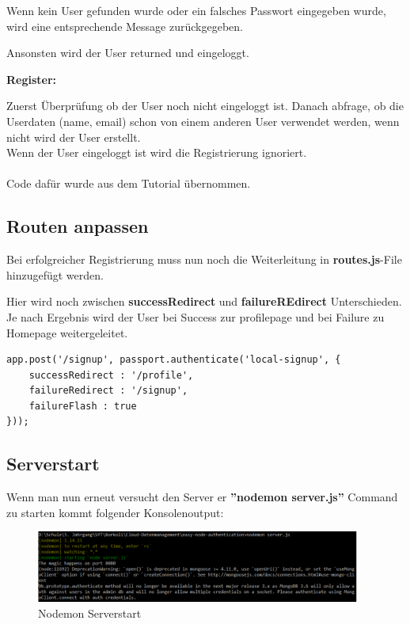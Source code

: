 \leftskip=20pt
Wenn kein User gefunden wurde oder ein falsches Passwort eingegeben wurde, wird eine entsprechende Message zurückgegeben.

Ansonsten wird der User returned und eingeloggt.

\leftskip=0pt
\textbf{Register:}

\leftskip=20pt
Zuerst Überprüfung ob der User noch nicht eingeloggt ist.
Danach abfrage, ob die Userdaten (name, email) schon von einem anderen User verwendet werden, wenn nicht wird der User erstellt.\\

Wenn der User eingeloggt ist wird die Registrierung ignoriert.\\\\

\leftskip=0pt
Code dafür wurde aus dem Tutorial übernommen.

\subsection{Routen anpassen}
Bei erfolgreicher Registrierung muss nun noch die Weiterleitung in \textbf{routes.js}-File hinzugefügt werden. 

Hier wird noch zwischen \textbf{successRedirect} und \textbf{failureREdirect} Unterschieden. Je nach Ergebnis wird der User bei Success zur profilepage und bei Failure zu Homepage weitergeleitet.

\begin{lstlisting}
app.post('/signup', passport.authenticate('local-signup', {
	successRedirect : '/profile', 
	failureRedirect : '/signup', 
	failureFlash : true 
}));
\end{lstlisting}

\subsection{Serverstart}
Wenn man nun erneut versucht den Server er \textbf{''nodemon server.js''} Command zu starten kommt folgender Konsolenoutput:

\begin{figure}[!h] 
	\centering
	\includegraphics[width=0.95\textwidth]{images/serverstart.PNG}
	\caption{Nodemon Serverstart}
	\label{fig:Nodemon Serverstart}
\end{figure}

